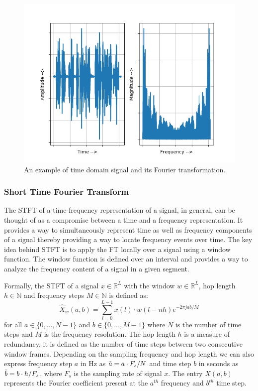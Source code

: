 \begin{figure}
    \centering
    \includegraphics[width=0.85\columnwidth, height=0.40\columnwidth]{master_thesis_template/figs/fft.png}
    \caption[An example of DFT of a signal]{An example of time domain signal and its Fourier transformation.}
    \label{fig:speech_ex}
\end{figure}

\subsubsection{Short Time Fourier Transform}
The STFT of a time-frequency representation of a signal, in general, can be thought of as a compromise between a time and a frequency representation. It provides a way to simultaneously represent time as well as frequency components of a signal thereby providing a way to locate frequency events over time. The key idea behind STFT is to apply the FT locally over a signal using a window function. The window function is defined over an interval and provides a way to analyze the frequency content of a signal in a given segment.

Formally, the STFT of a signal $x\in\mathbb{R}^L$ with the window $w\in\mathbb{R}^L$, hop length $h\in\mathbb{N}$ and frequency steps $M\in\mathbb{N}$  is defined as:
\begin{equation}
    \hat{X}_w(a,b) = \sum_{l=0}^{L-1} x(l)\cdot w(l-nh)e^{-2\pi jab/M}
\end{equation}
for all $a\in\{0,...,N-1\}$ and $b\in\{0,...,M-1\}$ where $N$ is the number of time steps and $M$ is the frequency resolution. The hop length $h$ is a measure of redundancy, it is defined as the number of time steps between two consecutive window frames. Depending on the sampling frequency and hop length we can also express frequency step $a$ in Hz as $\Tilde{a} = a\cdot F_s/N$ and time step $b$ in seconds as $\Tilde{b}=b\cdot h/F_s$, where $F_s$ is the sampling rate of signal $x$. The entry $X(a,b)$ represents the Fourier coefficient present at the $a^{th}$ frequency and $b^{th}$ time step. 

